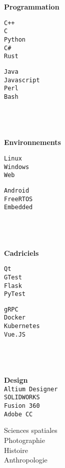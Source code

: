 \documentclass[9pt]{developercv} %
\begin{document}
\begin{minipage}[t]{0.18\textwidth}
		\textbf{Programmation}\\
		\begin{minipage}[t]{0.5\textwidth}
			\texttt{C++}\\
			\texttt{C}\\
			\texttt{Python}\\
			\texttt{C\#}\\
			\texttt{Rust}
		\end{minipage}
		\begin{minipage}[t]{0.45\textwidth}
			\texttt{Java}\\
			\texttt{Javascript}\\
			\texttt{Perl}\\
			\texttt{Bash}
		\end{minipage}
		\\\\\\
		\textbf{Environnements}\\
		\begin{minipage}[t]{0.5\textwidth}
			\texttt{Linux}\\
			\texttt{Windows}\\
			\texttt{Web}
		\end{minipage}
		\begin{minipage}[t]{0.45\textwidth}
			\texttt{Android}\\
			\texttt{FreeRTOS}\\
			\texttt{Embedded}
		\end{minipage}
		\\\\\\
		\textbf{Cadriciels}\\
		\begin{minipage}[t]{0.5\textwidth}
			\texttt{Qt}\\
			\texttt{GTest}\\
			\texttt{Flask}\\
			\texttt{PyTest}
		\end{minipage}
		\begin{minipage}[t]{0.45\textwidth}
			\texttt{gRPC}\\
			\texttt{Docker}\\
			\texttt{Kubernetes}\\
			\texttt{Vue.JS}
		\end{minipage}
		\\\\\\
		\textbf{Design}\\
		\texttt{Altium Designer}\\
		\texttt{SOLIDWORKS}\\
		\texttt{Fusion 360}\\
		\texttt{Adobe CC}

		Sciences spatiales\\
		Photographie\\
		Histoire\\
		Anthropologie
\end{minipage}

\end{document}
